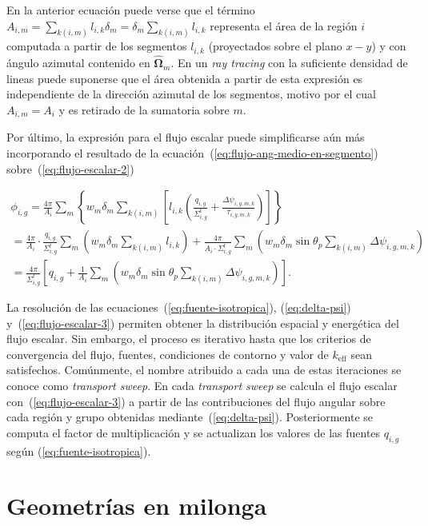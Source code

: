 \documentclass[11pt]{article}
\begin{document}
\noindent
En la anterior ecuación puede verse que el t\'ermino $A_{i,m} = \sum_{k(i,m)} l_{i,k} \delta_m = \delta_m \sum_{k(i,m)} l_{i,k}$ representa el área de la región $i$ computada a partir de los segmentos $l_{i,k}$ (proyectados sobre el plano $x - y$) y con ángulo azimutal contenido en $\boldsymbol{\hat{\Omega}}_m$. En un \emph{ray tracing} con la suficiente densidad de lineas puede suponerse que el área obtenida a partir de esta expresi\'on es independiente de la dirección azimutal de los segmentos, motivo por el cual $A_{i,m} = A_i$ y es retirado de la sumatoria sobre $m$.

Por último, la expresi\'on para el flujo escalar puede simplificarse aún m\'as incorporando el resultado de la ecuación~(\ref{eq:flujo-ang-medio-en-segmento}) sobre~(\ref{eq:flujo-escalar-2})

\begin{multline} \label{eq:flujo-escalar-3}
 \phi_{i,g} =
 \frac{4\pi}{A_i} \sum_m \left\lbrace w_m \delta_m \sum_{k(i,m)} \left[ l_{i,k} \left( \frac{q_{i,g}}{\Sigma^t_{i,g}} + \frac{\Delta \psi_{i,g,m,k}}{\tau_{i,g,m,k}} \right) \right] \right\rbrace \\ 
 = \frac{4\pi}{A_i} \cdot \frac{q_{i,g}}{\Sigma^t_{i,g}} \sum_m \left( w_m \delta_m \sum_{k(i,m)} l_{i,k} \right) + \frac{4\pi}{A_i \cdot \Sigma^t_{i,g}} \sum_m \left( w_m \delta_m \sin \theta_p \sum_{k(i,m)} \Delta \psi_{i,g,m,k} \right) \\ 
 = \frac{4\pi}{\Sigma^t_{i,g}} \left[ q_{i,g} + \frac{1}{A_i} \sum_m \left( w_m \delta_m \sin \theta_p \sum_{k(i,m)} \Delta \psi_{i,g,m,k} \right) \right]
 .
\end{multline}

La resolución de las ecuaciones~(\ref{eq:fuente-isotropica}), (\ref{eq:delta-psi}) y~(\ref{eq:flujo-escalar-3}) permiten obtener la distribución espacial y energética del flujo escalar. Sin embargo, el proceso es iterativo hasta que los criterios de convergencia del flujo, fuentes, condiciones de contorno y valor de $k_{\text{eff}}$ sean satisfechos. Comúnmente, el nombre atribuido a cada una de estas iteraciones se conoce como \emph{transport sweep}. En cada \emph{transport sweep} se calcula el flujo escalar con~(\ref{eq:flujo-escalar-3}) a partir de las contribuciones del flujo angular sobre cada región y grupo obtenidas mediante~(\ref{eq:delta-psi}). Posteriormente se computa el factor de multiplicación y se actualizan los valores de las fuentes $q_{i,g}$ seg\'un (\ref{eq:fuente-isotropica}).

\section{Geometr\'ias en milonga}
\end{document}
